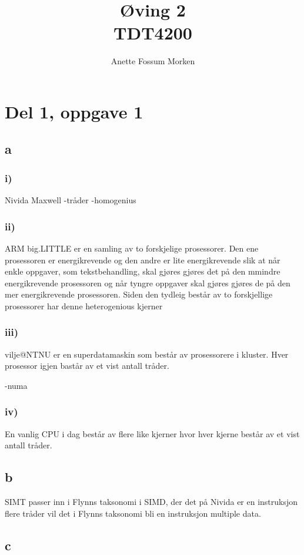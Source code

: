 \documentclass[12pt, a4paper]{article} %
\title{Øving 2\\ TDT4200}
\author[1]{Anette Fossum Morken}
\date{}
\begin{document}
\maketitle

\section*{Del 1, oppgave 1}
\subsection*{a}
\subsubsection*{i)}
Nivida Maxwell 
-tråder
-homogenius
\subsubsection*{ii)}
ARM big.LITTLE er en samling av to forskjelige prosessorer. Den ene prosessoren er energikrevende og den andre er lite energikrevende slik at når enkle oppgaver, som tekstbehandling, skal gjøres gjøres det på den mmindre energikrevende prosessoren og når tyngre oppgaver skal gjøres gjøres de på den mer energikrevende prosessoren. Siden den tydleig består av to forskjellige prosessorer har denne heterogenious kjerner 

\subsubsection*{iii)}
vilje@NTNU er en superdatamaskin som består av prosessorere i kluster. Hver prosessor igjen bastår av et vist antall tråder.

-numa

\subsubsection*{iv)}
En vanlig CPU i dag består av flere like kjerner hvor hver kjerne består av et vist antall tråder.  
\subsection*{b}
SIMT passer inn i Flynns taksonomi i SIMD, der det på Nivida er en instruksjon flere tråder vil det i Flynns taksonomi bli en instruksjon multiple data. 

\subsection*{c}
\end{document}
